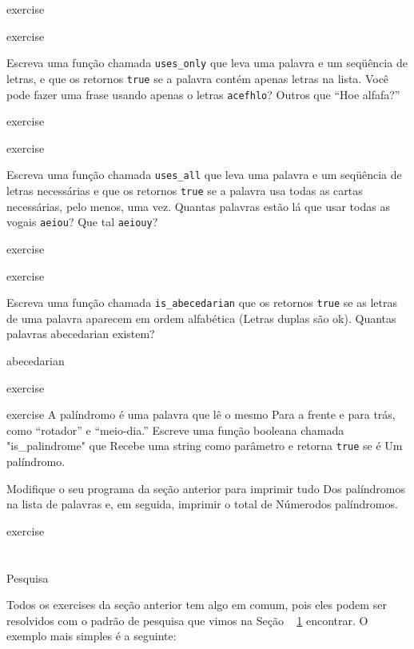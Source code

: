 \documentclass[10pt]{book}
\begin{document}
\begin{exercise}
\begin{}
\end{} exercise



\begin{} exercise

Escreva uma função chamada \verb "uses_only" que leva uma palavra e um
seqüência de letras, e que os retornos {\tt true} se a palavra contém
apenas letras na lista. Você pode fazer uma frase usando apenas o
letras {\tt acefhlo}? Outros que ``Hoe alfafa?''

\end{} exercise


\begin{} exercise 

Escreva uma função chamada \verb "uses_all" que leva uma palavra e um
seqüência de letras necessárias e que os retornos {\tt true} se a palavra
usa todas as cartas necessárias, pelo menos, uma vez. Quantas palavras estão lá
que usar todas as vogais {\tt aeiou}? Que tal {\tt aeiouy}?

\end{} exercise


\begin{} exercise

Escreva uma função chamada \verb "is_abecedarian" que os retornos
{\tt true} se as letras de uma palavra aparecem em ordem alfabética
(Letras duplas são ok).  
Quantas palavras abecedarian existem?

\index{} abecedarian

\end{} exercise


\begin{} exercise
\label{palíndromo}
A palíndromo é uma palavra que lê o mesmo
Para a frente e para trás, como ``rotador'' e ``meio-dia.''
Escreve uma função booleana chamada \verbo "is_palindrome" que
Recebe uma string como parâmetro e retorna {\tt true} se é
Um palíndromo.

Modifique o seu programa da seção anterior para imprimir tudo
Dos palíndromos na lista de palavras e, em seguida, imprimir o total de
Númerodos palíndromos.
\end{} exercise



\section{} Pesquisa

Todos os exercises da seção anterior tem algo
em comum, pois eles podem ser resolvidos com o padrão de pesquisa que vimos
na Seção ~ \ref {} encontrar. O exemplo mais simples é a seguinte:


\end{exercise}
\end{document}
